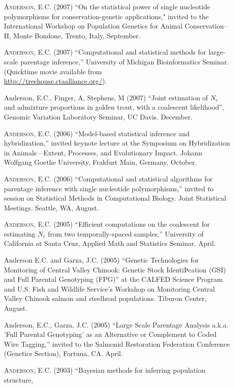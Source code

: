 \documentclass[11pt]{article}
\begin{document}
\begin{description}
\item[] \textsc{Anderson, E.C.} (2007) ``On the statistical power of  single nucleotide polymorphisms for conservation-genetic applications," invited to the International Workshop on
Population Genetics for Animal Conservation--II, Monte Bondone, Trento, Italy, September.
\item[] \textsc{Anderson, E.C.} (2007) ``Computational and statistical methods for large-scale parentage inference,'' University of Michigan Bioinformatics Seminar.  (Quicktime movie available from \\
\href{http://treehouse.ctaalliance.org/}{http://treehouse.ctaalliance.org/}).
\item[] {\sc Anderson, E.C.}, Finger, A, Stephens, M (2007) ``Joint estimation of $N_e$ and admixture proportions in golden trout, with a coalescent likelihood'', Genomic Variation Laboratory Seminar, UC Davis. December.
\item[] \textsc{Anderson, E.C.} (2006) ``Model-based statistical inference and hybridization,'' invited keynote lecture at the Symposium on Hybridization in Animals---Extent, Processes, and Evolutionary Impact.  Johann Wolfgang Goethe University, Frakfurt Main, Germany, October.
\item[] \textsc{Anderson, E.C.} (2006) ``Computational and statistical algorithms for parentage inference with single nucleotide polymorphisms,'' invited to session on Statistical Methods in Computational Biology.  Joint Statistical Meetings. Seattle, WA, August.
\item[] \textsc{Anderson, E.C.} (2005) ``Efficient computations on the coalescent for estimating $N_e$ from two temporally-spaced samples,'' University of California at Santa Cruz, Applied Math and Statistics Seminar. April.
\item[] {\sc Anderson E.C.} and Garza, J.C. (2005) ``Genetic Technologies for Monitoring of Central Valley Chinook: Genetic Stock IdentiÞcation (GSI) and Full Parental Genotyping (FPG)'' at the CALFED Science Program and U.S. Fish and Wildlife Service's Workshop on Monitoring Central Valley Chinook salmon and steelhead populations. Tiburon Center, August.
\item[] {\sc Anderson, E.C.}, Garza, J.C. (2005) ``Large Scale Parentage Analysis a.k.a. 'Full Parental Genotyping' as an Alternative or Complement to Coded Wire Tagging,'' invited to the Salmonid Restoration Federation Conference (Genetics Section), Fortuna, CA. April.
\item[] \textsc{Anderson, E.C.} (2003) ``Bayesian methods for inferring population structure,

\end{description}
\end{document}
